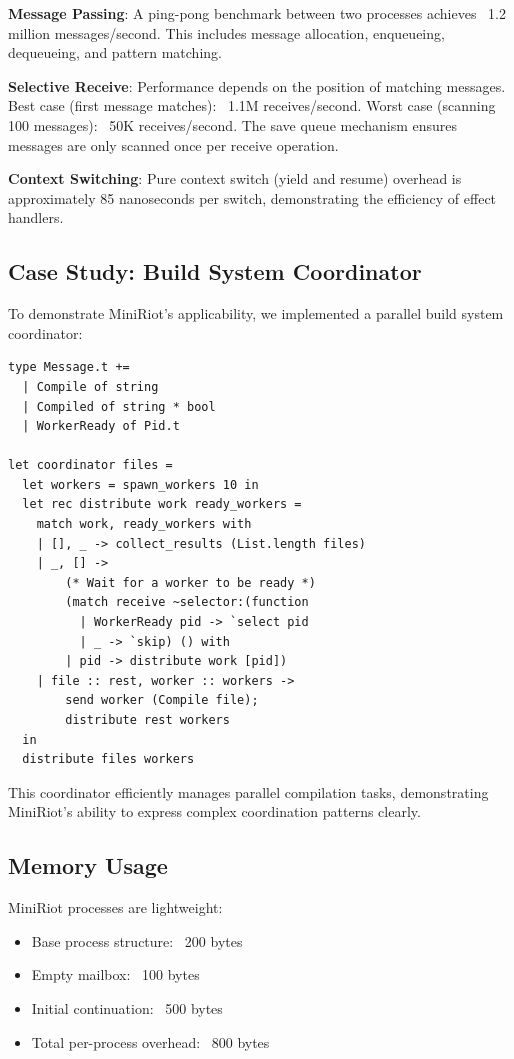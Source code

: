 \documentclass[sigplan,screen]{acmart}
\begin{document}
\textbf{Message Passing}: A ping-pong benchmark between two processes achieves ~1.2 million messages/second. This includes message allocation, enqueueing, dequeueing, and pattern matching.

\textbf{Selective Receive}: Performance depends on the position of matching messages. Best case (first message matches): ~1.1M receives/second. Worst case (scanning 100 messages): ~50K receives/second. The save queue mechanism ensures messages are only scanned once per receive operation.

\textbf{Context Switching}: Pure context switch (yield and resume) overhead is approximately 85 nanoseconds per switch, demonstrating the efficiency of effect handlers.

\subsection{Case Study: Build System Coordinator}

To demonstrate MiniRiot's applicability, we implemented a parallel build system coordinator:

\begin{lstlisting}
type Message.t += 
  | Compile of string
  | Compiled of string * bool
  | WorkerReady of Pid.t

let coordinator files =
  let workers = spawn_workers 10 in
  let rec distribute work ready_workers =
    match work, ready_workers with
    | [], _ -> collect_results (List.length files)
    | _, [] -> 
        (* Wait for a worker to be ready *)
        (match receive ~selector:(function
          | WorkerReady pid -> `select pid
          | _ -> `skip) () with
        | pid -> distribute work [pid])
    | file :: rest, worker :: workers ->
        send worker (Compile file);
        distribute rest workers
  in
  distribute files workers
\end{lstlisting}

This coordinator efficiently manages parallel compilation tasks, demonstrating MiniRiot's ability to express complex coordination patterns clearly.

\subsection{Memory Usage}

MiniRiot processes are lightweight:
\begin{itemize}
\item Base process structure: ~200 bytes
\item Empty mailbox: ~100 bytes  
\item Initial continuation: ~500 bytes
\item Total per-process overhead: ~800 bytes
\end{itemize}
\end{document}
